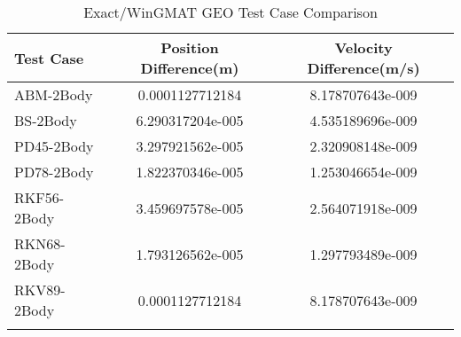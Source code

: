 \begin{table}[htbp!]
\centering
\caption{ Exact/WinGMAT GEO Test Case Comparison}
      \begin{tabular}{lcc}
      \hline\hline
          Test Case & Position Difference(m) & Velocity Difference(m/s) \\
         \hline
         ABM-2Body & 0.0001127712184 & 8.178707643e-009 \\
         BS-2Body & 6.290317204e-005 & 4.535189696e-009 \\
         PD45-2Body & 3.297921562e-005 & 2.320908148e-009 \\
         PD78-2Body & 1.822370346e-005 & 1.253046654e-009 \\
         RKF56-2Body & 3.459697578e-005 & 2.564071918e-009 \\
         RKN68-2Body & 1.793126562e-005 & 1.297793489e-009 \\
         RKV89-2Body & 0.0001127712184 & 8.178707643e-009 \\
      \hline\hline
      \label{Table: GEO Exact-WinGMAT Table} 
\end{tabular}
\end{table}
